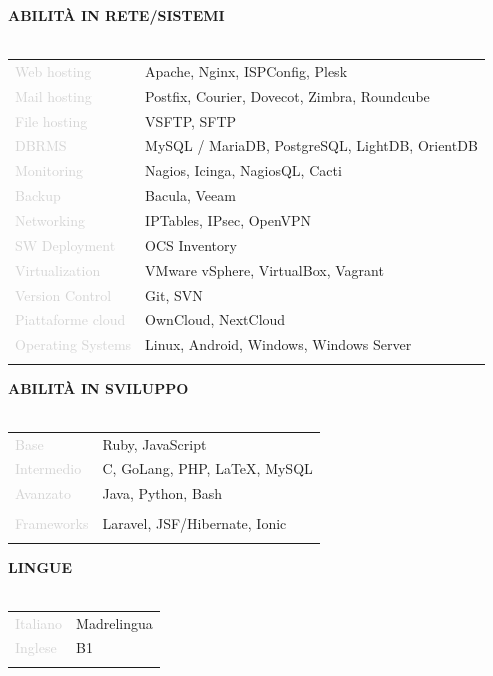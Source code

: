 \documentclass{article}
\begin{document}
\textbf{\textcolor{deepblue}{ABILIT\`A IN RETE/SISTEMI}} \\\\ \hfill
\begin{tabular}{ R{4cm} l }
	\textcolor{lightgray}{Web hosting}       & Apache, Nginx, ISPConfig, Plesk                \\ \hfill
	\textcolor{lightgray}{Mail hosting}      & Postfix, Courier, Dovecot, Zimbra, Roundcube   \\ \hfill
	\textcolor{lightgray}{File hosting}      & VSFTP, SFTP                                    \\ \hfill
	\textcolor{lightgray}{DBRMS}             & MySQL / MariaDB, PostgreSQL, LightDB, OrientDB \\ \hfill
	\textcolor{lightgray}{Monitoring}        & Nagios, Icinga, NagiosQL, Cacti                \\ \hfill
	\textcolor{lightgray}{Backup}            & Bacula, Veeam                                  \\ \hfill
	\textcolor{lightgray}{Networking}        & IPTables, IPsec, OpenVPN                       \\ \hfill
	\textcolor{lightgray}{SW Deployment}     & OCS Inventory                                  \\ \hfill
	\textcolor{lightgray}{Virtualization}    & VMware vSphere, VirtualBox, Vagrant            \\ \hfill
	\textcolor{lightgray}{Version Control}   & Git, SVN                                       \\ \hfill
	\textcolor{lightgray}{Piattaforme cloud} & OwnCloud, NextCloud                            \\ \hfill
	\textcolor{lightgray}{Operating Systems} & Linux, Android, Windows, Windows Server        \\ \hfill
\end{tabular}

\textbf{\textcolor{deepblue}{ABILIT\`A IN SVILUPPO}} \\\\ \hfill
\begin{tabular}{ R{4cm} l }
	\textcolor{lightgray}{Base}       & Ruby, JavaScript              \\ \hfill
	\textcolor{lightgray}{Intermedio} & C, GoLang, PHP, LaTeX, MySQL  \\ \hfill
	\textcolor{lightgray}{Avanzato}   & Java, Python, Bash            \\\\ \hfill
	\textcolor{lightgray}{Frameworks} & Laravel, JSF/Hibernate, Ionic \\ \hfill
\end{tabular}

\textbf{\textcolor{deepblue}{LINGUE}} \\\\ \hfill
\begin{tabular}{ R{4cm} l }
	\textcolor{lightgray}{Italiano} & Madrelingua \\ \hfill
	\textcolor{lightgray}{Inglese}  & B1          \\ \hfill
\end{tabular}
\end{document}
